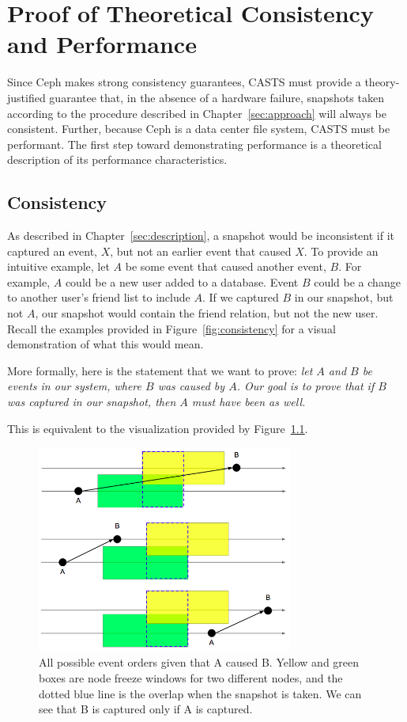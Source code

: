\chapter{Proof of Theoretical Consistency and Performance}
\label{sec:proof}

Since Ceph makes strong consistency guarantees, CASTS must provide a
theory-justified guarantee that, in the absence of a hardware failure,
snapshots taken according to the procedure described in
Chapter~\ref{sec:approach} will always be consistent. Further, because
Ceph is a data center file system, CASTS must be performant. The first
step toward demonstrating performance is a theoretical description of
its performance characteristics.

\section{Consistency}

As described in Chapter~\ref{sec:description}, a snapshot would be
inconsistent if it captured an event, $X$, but not an earlier event that
caused $X$. To provide an intuitive example, let $A$ be some event that
caused another event, $B$.  For example, $A$ could be a new user added
to a database. Event $B$ could be a change to another user's friend
list to include $A$. If we captured $B$ in our snapshot, but not $A$,
our snapshot would contain the friend relation, but not the new
user. Recall the examples provided in Figure~\ref{fig:consistency} for
a visual demonstration of what this would mean.

More formally, here is the statement that we want to prove: {\em let
  $A$ and $B$ be events in our system, where $B$ was caused by
  $A$. Our goal is to prove that if $B$ was captured in our snapshot,
  then $A$ must have been as well.}

This is equivalent to the visualization provided by
Figure~\ref{fig:consistentoverlap}.

\begin{figure}[!htbp]
  \centering
  \caption{All possible event orders given that A caused B. Yellow and green boxes are node freeze windows for two different nodes, and the dotted blue line is the overlap when the snapshot is taken. We can see that B is captured only if A is captured.}
  \label{fig:consistentoverlap}
  \includegraphics[width=0.75\textwidth]{consistentoverlap.png}
\end{figure}

